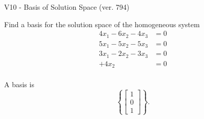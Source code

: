 \begin{exercise}
  \begin{exerciseTitle}V10 - Basis of Solution Space (ver. 794)\end{exerciseTitle}
  \begin{exerciseStatement}
    Find a basis for the solution space of the homogeneous system 
\begin{align*}
 4 x_ 1 -6 x_ 2 -4 x_ 3 &= 0  \\ 
  5 x_ 1 -5 x_ 2 -5 x_ 3 &= 0  \\ 
  3 x_ 1 -2 x_ 2 -3 x_ 3 &= 0  \\ 
  + 4 x_ 2 &= 0  \\ 
 \end{align*}


 
  \end{exerciseStatement}

  \begin{exerciseAnswer}
   A basis is   
\[\left\{\left[\begin{array}{c}
1 \\
0 \\
1
\end{array}\right]\right\}.\]

  


  \end{exerciseAnswer}
\end{exercise}